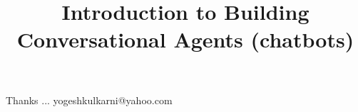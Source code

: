 \documentclass[xcolor=dvipsnames,compress,t,pdf,9pt]{beamer}
\title[\insertframenumber /\inserttotalframenumber]{Introduction to Building Conversational Agents (chatbots)}
\begin{document}
	\begin{frame}
	\titlepage
%
	\end{frame}
	
%	
	
	
	\begin{frame}[c]{}
	Thanks ...
	\vspace{5mm}
	yogeshkulkarni@yahoo.com
	\end{frame}
\end{document}
